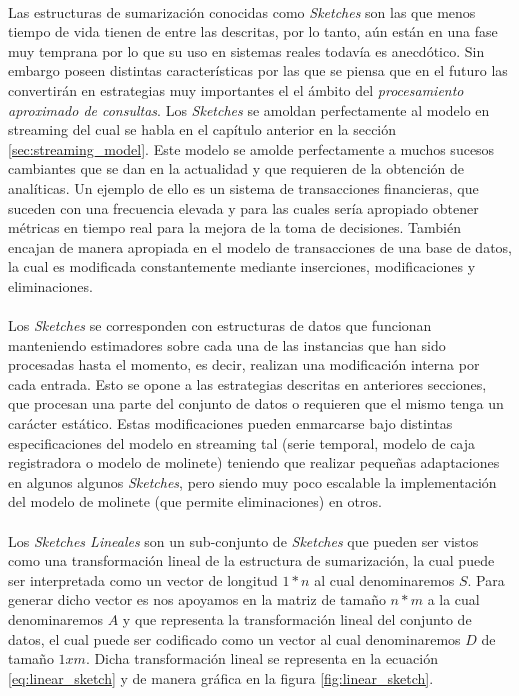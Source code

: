 \documentclass{subfiles}
\begin{document}
        \paragraph{}
        Las estructuras de sumarización conocidas como \emph{Sketches} son las que menos tiempo de vida tienen de entre las descritas, por lo tanto, aún están en una fase muy temprana por lo que su uso en sistemas reales todavía es anecdótico. Sin embargo poseen distintas características por las que se piensa que en el futuro las convertirán en estrategias muy importantes el el ámbito del \emph{procesamiento aproximado de consultas}. Los \emph{Sketches} se amoldan perfectamente al modelo en streaming del cual se habla en el capítulo anterior en la sección \ref{sec:streaming_model}. Este modelo se amolde perfectamente a muchos sucesos cambiantes que se dan en la actualidad y que requieren de la obtención de analíticas. Un ejemplo de ello es un sistema de transacciones financieras, que suceden con una frecuencia elevada y para las cuales sería apropiado obtener métricas en tiempo real para la mejora de la toma de decisiones. También encajan de manera apropiada en el modelo de transacciones de una base de datos, la cual es modificada constantemente mediante inserciones, modificaciones y eliminaciones.

        \paragraph{}
        Los \emph{Sketches} se corresponden con estructuras de datos que funcionan manteniendo estimadores sobre cada una de las instancias que han sido procesadas hasta el momento, es decir, realizan una modificación interna por cada entrada. Esto se opone a las estrategias descritas en anteriores secciones, que procesan una parte del conjunto de datos o requieren que el mismo tenga un carácter estático. Estas modificaciones pueden enmarcarse bajo distintas especificaciones del modelo en streaming tal (serie temporal, modelo de caja registradora o modelo de molinete) teniendo que realizar pequeñas adaptaciones en algunos algunos \emph{Sketches}, pero siendo muy poco escalable la implementación del modelo de molinete (que permite eliminaciones) en otros.

        \paragraph{}
        Los \emph{Sketches Lineales} son un sub-conjunto de \emph{Sketches} que pueden ser vistos como una transformación lineal de la estructura de sumarización, la cual puede ser interpretada como un vector de longitud $1*n$ al cual denominaremos $S$. Para generar dicho vector es nos apoyamos en la matriz de tamaño $n*m$ a la cual denominaremos $A$ y que representa la transformación lineal del conjunto de datos, el cual puede ser codificado como un vector al cual denominaremos $D$ de tamaño $1xm$. Dicha transformación lineal se representa en la ecuación \eqref{eq:linear_sketch} y de manera gráfica en la figura \ref{fig:linear_sketch}.
\end{document}
